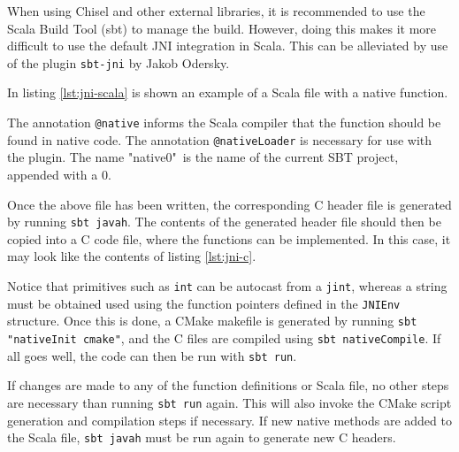 \documentclass[conference]{IEEEtran}
\newcommand{\longlist}[3]{{}}
\begin{document}
When using Chisel and other external libraries, it is recommended to use the Scala Build Tool (sbt) to manage the build. However, doing this makes it more difficult to use the default JNI integration in Scala. This can be alleviated by use of the plugin \texttt{sbt-jni} by Jakob Odersky. 

In listing \ref{lst:jni-scala} is shown an example of a Scala file with a native function.

\longlist{snippets/Myclass.scala}{Example Scala code showing how to integrate native code in Scala.}{lst:jni-scala}


The annotation \texttt{@native} informs the Scala compiler that the function should be found in native code. The annotation \texttt{@nativeLoader} is necessary for use with the plugin. The name "native0"\, is the name of the current SBT project, appended with a 0.

Once the above file has been written, the corresponding C header file is generated by running \texttt{sbt javah}. The contents of the generated header file should then be copied into a C code file, where the functions can be implemented. In this case, it may look like the contents of listing \ref{lst:jni-c}.

\longlist{snippets/Myclass.c}{C implementation of the methods declared in Myclass in listing \ref{lst:jni-scala}.}{lst:jni-c}


Notice that primitives such as \texttt{int} can be autocast from a \texttt{jint}, whereas a string must be obtained used using the function pointers defined in the \texttt{JNIEnv} structure. Once this is done, a CMake makefile is generated by running \texttt{sbt "nativeInit cmake"}, and the C files are compiled using \texttt{sbt nativeCompile}. If all goes well, the code can then be run with \texttt{sbt run}. 

If changes are made to any of the function definitions or Scala file, no other steps are necessary than running \texttt{sbt run} again. This will also invoke the CMake script generation and compilation steps if necessary. If new native methods are added to the Scala file, \texttt{sbt javah} must be run again to generate new C headers.
\end{document}

